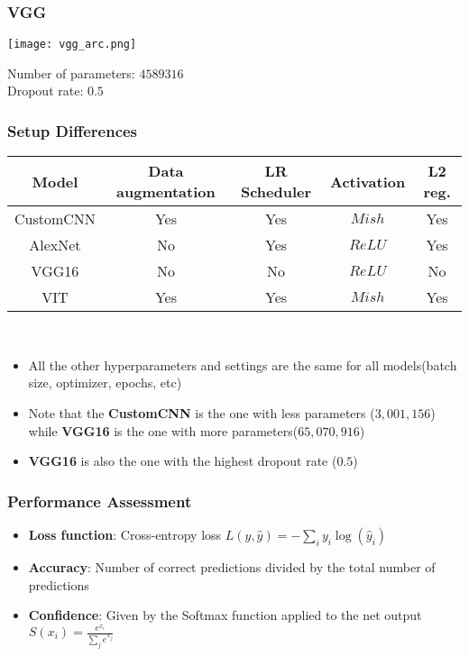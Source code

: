 \documentclass[../presentation.tex]{subfiles} %
\begin{document}
\begin{frame}

    \frametitle{VGG}
    
    \begin{center}
        \hspace*{-0.7cm}
        \texttt{[image: vgg\_arc.png]}
    \end{center}
    
    Number of parameters: $4589316$\\
    Dropout rate: $0.5$
\end{frame}

\begin{frame}
    \frametitle{Setup Differences}
    \hspace*{-0.7cm}
    \begin{tabular}{|c|c|c|c|c|}
        \hline
        \textbf{Model} & \textbf{Data augmentation} &\textbf{LR Scheduler} & \textbf{Activation} & \textbf{L2 reg.} \\
        \hline
        CustomCNN & Yes & Yes & $Mish$ & Yes \\
        AlexNet & No & Yes & $ReLU$ & Yes \\
        VGG16 & No & No & $ReLU$ & No \\
        VIT & Yes & Yes & $Mish$ & Yes \\
        \hline
    \end{tabular}\\
    \vspace{0.5cm}
    \begin{cbox}
        \begin{itemize}
            \item All the other hyperparameters and settings are the same for all models(batch size, optimizer, epochs, etc)
            \item Note that the \textbf{CustomCNN} is the one with less parameters ($3,001,156$) while \textbf{VGG16} is the one with more parameters($65,070,916$)
            \item \textbf{VGG16} is also the one with the highest dropout rate ($0.5$)
        \end{itemize}
    \end{cbox}
\end{frame}

\begin{frame}
    \frametitle{Performance Assessment}
    \begin{itemize}
        \item \textbf{Loss function}: Cross-entropy loss $L(y, \hat{y}) = -\sum_{i} y_i \log(\hat{y}_i)$
        \item \textbf{Accuracy}: Number of correct predictions divided by the total number of predictions
        \item \textbf{Confidence}: Given by the Softmax function applied to the net output $S(x_i) = \frac{e^{x_i}}{\sum_{j} e^{x_j}}$
    \end{itemize}

\end{frame}
\end{document}
